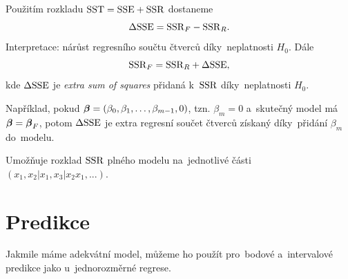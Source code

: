 \begin{remark}
Použitím rozkladu $\mathrm{SST} = \mathrm{SSE} + \mathrm{SSR}$ dostaneme
 $$
\Delta \mathrm{SSE} = \mathrm{SSR}_F - \mathrm{SSR}_R.
 $$
Interpretace: nárůst regresního součtu čtverců díky~neplatnosti $H_0$. Dále
 $$
\mathrm{SSR}_F = \mathrm{SSR}_R + \Delta \mathrm{SSE},
 $$
kde $\Delta \mathrm{SSE}$ je \textit{extra sum of squares} přidaná k~$\mathrm{SSR}$ díky~neplatnosti $H_0$.

Například, pokud $\boldsymbol{\beta} = (\beta_0, \beta_1,\dots, \beta_{m-1}, 0)$, tzn. $\beta_m = 0$ a~skutečný model má $\boldsymbol{\beta} = \boldsymbol{\beta}_F$, potom $\Delta \mathrm{SSE}$ je extra regresní součet čtverců získaný díky~přidání $\beta_m$ do~modelu.

Umožňuje rozklad $\mathrm{SSR}$ plného modelu na~jednotlivé části $\left(x_1, x_2 | x_1, x_3 | x_2 x_1,... \right)$.
\end{remark}




\section{Predikce}
Jakmile máme adekvátní model, můžeme ho použít pro~bodové a~intervalové predikce jako u~jednorozměrné regrese.

